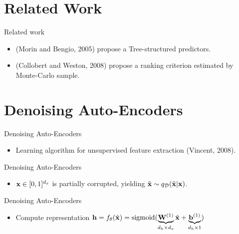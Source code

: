 \documentclass{beamer}
\begin{document}

\section{Related Work}
\begin{frame}{Related work}
\begin{itemize}
\item (Morin and Bengio, 2005) propose a Tree-structured predictors.
\item (Collobert and Weston, 2008) propose a ranking criterion estimated
by Monte-Carlo sample.
\end{itemize}
\end{frame}

\section{Denoising Auto-Encoders}
\begin{frame}{Denoising Auto-Encoders}
\begin{center}
	\begin{figure}[htbp]
		\resizebox{0.8\linewidth}{!}{}
	\end{figure}
\end{center}

\begin{itemize}
\item Learning algorithm
for unsupervised feature extraction (Vincent, 2008).
\end{itemize}
\end{frame}

\begin{frame}{Denoising Auto-Encoders}
\begin{center}
	\begin{figure}[htbp]
		\resizebox{0.8\linewidth}{!}{}
	\end{figure}
\end{center}

\begin{itemize}
\item ${\bf x} \in [0,1]^{d_x}$ is partially corrupted,
yielding $\tilde{\bf x} \sim q_{\mathcal{D}}(\tilde{\bf x}|{\bf x})$. 
\end{itemize}
\end{frame}

\begin{frame}{Denoising Auto-Encoders}
\begin{center}
	\begin{figure}[htbp]
		\resizebox{0.8\linewidth}{!}{}
	\end{figure}
\end{center}

\begin{itemize}
\item Compute representation ${\bf h} = f_\theta(\tilde{\bf x})=\mathrm{sigmoid}(\underbrace{{\bf W}^{(1)}}_{d_h\times d_x} \tilde{\bf x} + \underbrace{{\bf b}^{(1)}}_{d_h \times 1})$
\end{itemize}
\end{frame}
\end{document}
